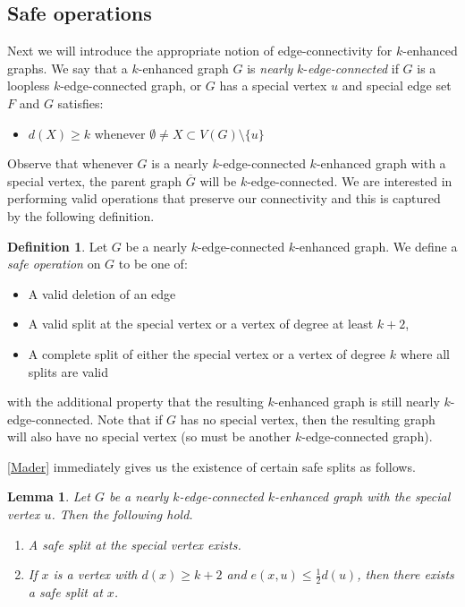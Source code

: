 \documentclass[letterpaper,11pt]{article}
\newtheorem{lemma}[theorem]{Lemma}
\theoremstyle{definition}
\newtheorem*{definition}{Definition}
\begin{document}
\subsection{Safe operations}
\label{sub-safe}

Next we will introduce the appropriate notion of edge-connectivity for $k$-enhanced graphs.  We say that a $k$-enhanced graph $G$ is \emph{nearly} $k$-\emph{edge-connected} if $G$ is a loopless $k$-edge-connected graph, or $G$ has a special vertex $u$ and special edge set $F$ and $G$ satisfies:
\begin{itemize}
\item $d(X) \ge k$ whenever $\emptyset \neq X \subset V(G)\setminus \{u\}$
\end{itemize}

Observe that whenever $G$ is a nearly $k$-edge-connected $k$-enhanced graph with a special vertex, the parent graph $\overline{G}$ will be $k$-edge-connected.  We are interested in performing valid operations that preserve our connectivity and this is captured by the following definition.  
	
	
\begin{definition}
Let $G$ be a nearly $k$-edge-connected $k$-enhanced graph. We define a \emph{safe operation} on $G$ to be one of:
\begin{itemize}
\item A valid deletion of an edge
\item A valid split at the special vertex or a vertex of degree at least $k+2$,
\item A complete split of  either the special vertex or a vertex of degree $k$ where all splits are valid
\end{itemize}
with the additional property that the resulting $k$-enhanced graph is still nearly $k$-edge-connected.
Note that if $G$ has no special vertex, then the resulting graph will also have no special vertex (so must be another  $k$-edge-connected graph).  
\end{definition}


\cref{Mader} immediately gives us the existence of certain safe splits as follows.



\begin{lemma}
	\label{safesplit}
	Let $G$ be a nearly $k$-edge-connected $k$-enhanced graph with the special vertex $u$. Then the following hold.
	\begin{enumerate}[label=(\arabic*)]
		\item
		\label{safe-s}
		A safe split at the special vertex exists.
		\item
		\label{safe-ns}
		If $x$ is a vertex with $d(x) \ge k+2$ and $e(x,u) \le \frac{1}{2} d(u)$, then there exists a safe split at $x$.  
	\end{enumerate}
\end{lemma}
\end{document}
